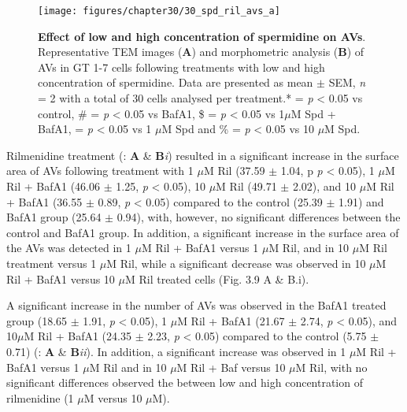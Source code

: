 {\begin{landscape}
\begin{figure}[!htbp]
\center
  \texttt{[image: figures/chapter30/30\_spd\_ril\_avs\_a]}
  \caption[Effect of low and high concentration of spermidine on AVs]{\textbf{Effect of low and high concentration of spermidine on AVs}. Representative TEM images (\textbf{A}) and morphometric analysis (\textbf{B}) of AVs in GT 1-7 cells following treatments with low and high concentration of spermidine. Data are presented as mean $\pm$ SEM, \textit{n} = 2 with a total of 30 cells analysed per treatment.* = \textit{p} < 0.05 vs control, \# = \textit{p} < 0.05 vs BafA1, \$ = \textit{p} < 0.05 vs 1$\mu$M Spd + BafA1, \@ = \textit{p} < 0.05 vs 1 $\mu$M Spd and  \% = \textit{p} < 0.05 vs 10 $\mu$M Spd.}
  \label{fig:30_spd_ril_avs_a}
\end{figure} 
\end{landscape}

Rilmenidine treatment (: \textbf{A} \& \textbf{B}\textit{i}) resulted in a significant increase in the surface area of AVs following treatment with 1 $\mu$M Ril (37.59 $\pm$ 1.04, p \textit{p} < 0.05), 1 $\mu$M Ril + BafA1 (46.06 $\pm$ 1.25, \textit{p} < 0.05), 10 $\mu$M Ril (49.71 $\pm$ 2.02), and 10 $\mu$M Ril + BafA1 (36.55 $\pm$ 0.89, \textit{p} < 0.05) compared to the control (25.39 $\pm$ 1.91) and BafA1 group (25.64 $\pm$ 0.94), with, however, no significant differences between the control and BafA1 group. In addition, a significant increase in the surface area of the AVs was detected in 1 $\mu$M Ril + BafA1 versus 1 $\mu$M Ril, and in 10 $\mu$M Ril treatment versus 1 $\mu$M Ril, while a significant decrease was observed in 10 $\mu$M Ril + BafA1 versus 10 $\mu$M Ril  treated cells (Fig. 3.9 A \& B.i).

A significant increase in the number of AVs was observed in the BafA1 treated group (18.65 $\pm$ 1.91, \textit{p} < 0.05), 1 $\mu$M Ril + BafA1 (21.67 $\pm$ 2.74, \textit{p} < 0.05), and 10$\mu$M Ril + BafA1 (24.35 $\pm$ 2.23, \textit{p} < 0.05) compared to the control (5.75 $\pm$ 0.71) (: \textbf{A} \& \textbf{B}\textit{ii}). In addition, a significant increase was observed in 1 $\mu$M Ril + BafA1 versus 1 $\mu$M Ril and in 10 $\mu$M Ril + Baf versus 10 $\mu$M Ril, with no significant differences observed the between low and high concentration of rilmenidine (1 $\mu$M versus 10 $\mu$M).

}
